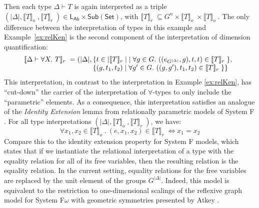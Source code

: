\documentclass[a4paper,UKenglish]{lipics}
\newcommand{\msf}[1]{\mathsf{#1}} %
\newcommand{\Set}{\msf{Set}}
\newcommand{\Sub}[1]{\msf{Sub}(#1)}
\newcommand{\LAb}{\msf{L}_{\msf{Ab}}}
\newcommand{\semo}[1]{\ensuremath{\llbracket #1 \rrbracket _o} \;}
\newcommand{\semr}[1]{\ensuremath{\llbracket #1 \rrbracket _r} \;}
\begin{document}
\begin{example}
  Then each type $\Delta \vdash T$ is again interpreted as a triple
  $(|\Delta|, \semo{T}, \semr{T}) \in \LAb \times \Sub{\Set}$, with
  $\semr{T} \subseteq G^n \times \semo{T} \times \semo{T}$. The only
  difference between the interpretation of types in this example and
  Example~\ref{ex:relKen} is the second component of the
  interpretation of dimension quantification:
  \begin{displaymath}
    \begin{array}{l@{\hspace{0.3em}}c@{\hspace{0.3em}}l}
      \semr{\Delta \vdash \forall X.~T} & = & (|\Delta|,
      \begin{array}[t]{@{}l}
        \{ t \in |\semr{T}| \mathrel| \forall g \in G.~((e_{G^{|\Delta|}},g), t, t) \in \semr{T} \},\\
        \{ (g, t_1, t_2) \mathrel| \forall g' \in G.~((g,g'), t_1, t_2) \in \semr{T} \} \}
      \end{array}
    \end{array}
  \end{displaymath}
  This interpretation, in contrast to the interpretation in Example
  \ref{ex:relKen}, has ``cut-down'' the carrier of the interpretation
  of $\forall$-types to only include the ``parametric'' elements. As a
  consequence, this interpretation satisfies an analogue of the
  \emph{Identity Extension} lemma from relationally parametric models
  of System F \cite{reynolds1983types}. For all type interpretations
  $(|\Delta|, \semo{T}, \semr{T})$, we have:
  \begin{displaymath}
    \forall x_1, x_2 \in \semo{T}.~(e,x_1,x_2) \in \semr{T} \Leftrightarrow x_1 = x_2
  \end{displaymath}
  Compare this to the identity extension property for System F models,
  which states that if we instantiate the relational interpretation of
  a type with the equality relation for all of its free variables,
  then the resulting relation is the equality relation. In the current
  setting, equality relations for the free variables are replaced by
  the unit element of the groups $G^{|\Delta|}$. Indeed, this model is
  equivalent to the restriction to one-dimensional scalings of the
  reflexive graph model for System F$\omega$ with geometric symmetries
  presented by Atkey \cite{atkey14conservation}.
\end{example}
\end{document}
